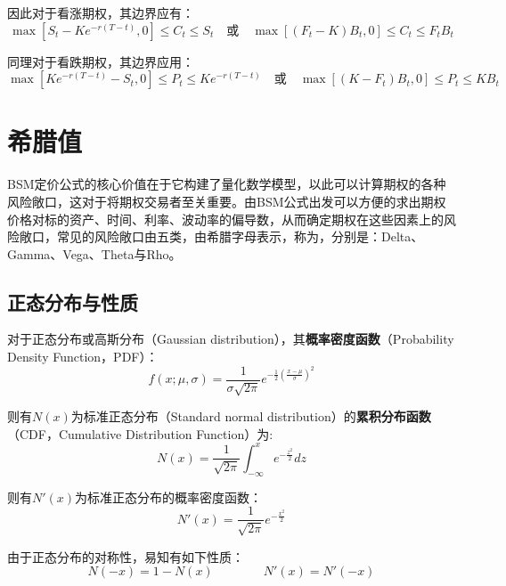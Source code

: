 \documentclass[11pt]{article}
\begin{document}
因此对于看涨期权，其边界应有：
\begin{equation*}
    \max\left[ S_t - Ke^{-r(T-t)},0 \right] \leq C_t \leq S_t 
    \quad \text{或} \quad
    \max\left[ (F_t - K) B_t,0 \right] \leq C_t \leq F_t B_t
\end{equation*}

同理对于看跌期权，其边界应用：
\begin{equation*}
    \max\left[ Ke^{-r(T-t)} - S_t,0 \right] \leq P_t \leq K e^{-r(T-t)}
    \quad \text{或} \quad
    \max\left[ (K - F_t) B_t,0 \right] \leq P_t \leq K B_t
\end{equation*}

\section{希腊值}

BSM定价公式的核心价值在于它构建了量化数学模型，以此可以计算期权的各种风险敞口，这对于将期权交易者至关重要。由BSM公式出发可以方便的求出期权价格对标的资产、时间、利率、波动率的偏导数，从而确定期权在这些因素上的风险敞口，常见的风险敞口由五类，由希腊字母表示，称为，分别是：Delta、Gamma、Vega、Theta与Rho。

\subsection{正态分布与性质}

对于正态分布或高斯分布（Gaussian distribution），其\textbf{概率密度函数}（Probability Density Function，PDF）：
\begin{equation*}
    f(x;\mu,\sigma) = \frac{1}{\sigma\sqrt{2\pi}} e^{-\frac{1}{2}\left(\frac{x-\mu}{\sigma} \right)^2}
\end{equation*}

则有$N(x)$为标准正态分布（Standard normal distribution）的\textbf{累积分布函数}（CDF，Cumulative Distribution Function）为:
\begin{equation*}
    N(x) = \frac{1}{\sqrt{2\pi}} \int_{-\infty}^{x}e^{-\frac{z^2}{2}}dz
\end{equation*}

则有$N'(x)$为标准正态分布的概率密度函数：
\begin{equation*}
    N'(x) = \frac{1}{\sqrt{2\pi}} e^{-\frac{x^2}{2}}
\end{equation*}

由于正态分布的对称性，易知有如下性质：
\begin{equation*}
    N(-x) = 1-N(x) \qquad \qquad
    N'(x) = N'(-x)
\end{equation*}
\end{document}
